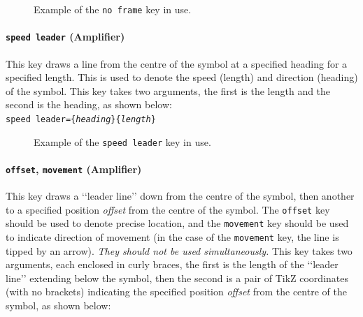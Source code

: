 \documentclass[a4paper, titlepage]{article}
\begin{document}
\begin{figure}[H]
\centering
{}
\caption{Example of the \texttt{no frame} key in use.}
\end{figure}

\paragraph{\texttt{speed leader} (Amplifier)}

This key draws a line from the centre of the symbol at a specified heading for a specified length. This is used to denote the speed (length) and direction (heading) of the symbol. This key takes two arguments, the first is the length and the second is the heading, as shown below:\\

\texttt{speed leader=\{\textit{heading}\}\{\textit{length}\}}

\begin{figure}[H]
\centering
{}
\caption{Example of the \texttt{speed leader} key in use.}
\end{figure}

\paragraph{\texttt{offset}, \texttt{movement} (Amplifier)}

This key draws a \lq\lq{}leader line\rq\rq{} down from the centre of the symbol, then another to a specified position \textit{offset} from the centre of the symbol. The \texttt{offset} key should be used to denote precise location, and the \texttt{movement} key should be used to indicate direction of movement (in the case of the \texttt{movement} key, the line is tipped by an arrow). \textit{They should not be used simultaneously.} This key takes two arguments, each enclosed in curly braces, the first is the length of the \lq\lq{}leader line\rq\rq{} extending below the symbol, then the second is a pair of TikZ coordinates (with no brackets) indicating the specified position \textit{offset} from the centre of the symbol, as shown below:\\
\end{document}
